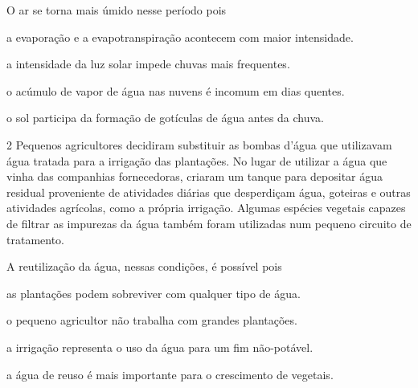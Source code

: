 O ar se torna mais úmido nesse período pois

\begin{escolha}
\item a evaporação e a evapotranspiração acontecem com maior intensidade.

\item a intensidade da luz solar impede chuvas mais frequentes.

\item o acúmulo de vapor de água nas nuvens é incomum em dias quentes.

\item o sol participa da formação de gotículas de água antes da chuva.
\end{escolha}


\num{2} Pequenos agricultores decidiram substituir as bombas d'água
que utilizavam água tratada para a irrigação das plantações. No lugar de
utilizar a água que vinha das companhias fornecedoras, criaram um tanque
para depositar água residual proveniente de atividades diárias que
desperdiçam água, goteiras e outras atividades agrícolas, como a própria
irrigação. Algumas espécies vegetais capazes de filtrar as impurezas da
água também foram utilizadas num pequeno circuito de tratamento.

A reutilização da água, nessas condições, é possível pois

\begin{escolha}
\item as plantações podem sobreviver com qualquer tipo de água.

\item o pequeno agricultor não trabalha com grandes plantações.

\item a irrigação representa o uso da água para um fim não-potável.

\item a água de reuso é mais importante para o crescimento de vegetais.
\end{escolha}


